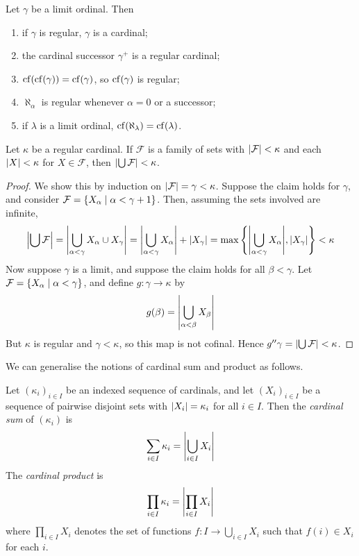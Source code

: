 \begin{theorem}
    Let \( \gamma \) be a limit ordinal.
    Then
    \begin{enumerate}
        \item if \( \gamma \) is regular, \( \gamma \) is a cardinal;
        \item the cardinal successor \( \gamma^+ \) is a regular cardinal;
        \item \( \operatorname{cf}(\operatorname{cf}(\gamma)) = \operatorname{cf}(\gamma) \), so \( \operatorname{cf}(\gamma) \) is regular;
        \item \( \aleph_\alpha \) is regular whenever \( \alpha = 0 \) or a successor;
        \item if \( \lambda \) is a limit ordinal, \( \operatorname{cf}(\aleph_\lambda) = \operatorname{cf}(\lambda) \).
    \end{enumerate}
\end{theorem}
\begin{theorem}
    Let \( \kappa \) be a regular cardinal.
    If \( \mathcal F \) is a family of sets with \( \abs{\mathcal F} < \kappa \) and each \( \abs{X} < \kappa \) for \( X \in \mathcal F \), then \( \abs{\bigcup \mathcal F} < \kappa \).
\end{theorem}
\begin{proof}
    We show this by induction on \( \abs{\mathcal F} = \gamma < \kappa \).
    Suppose the claim holds for \( \gamma \), and consider \( \mathcal F = \qty{X_\alpha \mid \alpha < \gamma + 1} \).
    Then, assuming the sets involved are infinite,
    \[ \abs{\bigcup \mathcal F} = \abs{\bigcup_{\alpha < \gamma} X_\alpha \cup X_\gamma} = \abs{\bigcup_{\alpha < \gamma} X_\alpha} + \abs{X_\gamma} = \max\qty{\abs{\bigcup_{\alpha < \gamma} X_\alpha}, \abs{X_\gamma}} < \kappa \]
    Now suppose \( \gamma \) is a limit, and suppose the claim holds for all \( \beta < \gamma \).
    Let \( \mathcal F = \qty{X_\alpha \mid \alpha < \gamma} \), and define \( g : \gamma \to \kappa \) by
    \[ g(\beta) = \abs{\bigcup_{\alpha < \beta} X_\beta} \]
    But \( \kappa \) is regular and \( \gamma < \kappa \), so this map is not cofinal.
    Hence \( g '' \gamma = \abs{\bigcup \mathcal F} < \kappa \).
\end{proof}
We can generalise the notions of cardinal sum and product as follows.
\begin{definition}
    Let \( (\kappa_i)_{i \in I} \) be an indexed sequence of cardinals, and let \( (X_i)_{i \in I} \) be a sequence of pairwise disjoint sets with \( \abs{X_i} = \kappa_i \) for all \( i \in I \).
    Then the \emph{cardinal sum} of \( (\kappa_i) \) is
    \[ \sum_{i \in I} \kappa_i = \abs{\bigcup_{i \in I} X_i} \]
    The \emph{cardinal product} is
    \[ \prod_{i \in I} \kappa_i = \abs{\prod_{i \in I} X_i} \]
    where \( \prod_{i \in I} X_i \) denotes the set of functions \( f : I \to \bigcup_{i \in I} X_i \) such that \( f(i) \in X_i \) for each \( i \).
\end{definition}
